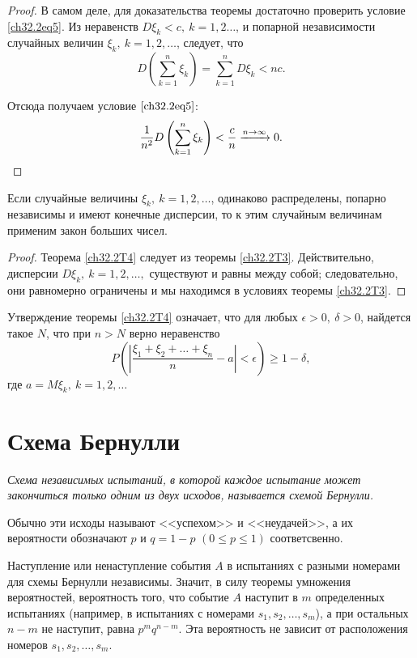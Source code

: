 \begin{proof}
В самом деле, для доказательства теоремы достаточно проверить условие \eqref{ch32.2eq5}. Из неравенств $D  \xi_k < c, \: k = 1, 2\ldots$, и попарной независимости случайных величин $\xi_k, \: k = 1,2,\ldots$, следует, что
$$
D  \left( \sum_{k  = 1}^{n} \xi_k\right) = \sum_{k  = 1}^{n} D  \xi_k  < nc.
$$

Отсюда получаем условие $\eqref{ch32.2eq5}$:
$$
\frac{1}{n^2} D  \left( \sum_{k  = 1}^{n} \xi_k\right) < \frac{c}{n} \xrightarrow{n \to \infty} 0. \qedhere
$$
\end{proof}

\begin{thm} \label{ch32.2T4}
Если случайные величины $\xi_k, \: k = 1,2,\ldots$, одинаково распределены, попарно независимы и имеют конечные дисперсии, то к этим случайным величинам применим закон больших чисел.
\end{thm}
\begin{proof}
Теорема \ref{ch32.2T4} следует из теоремы \ref{ch32.2T3}. Действительно, дисперсии $D\xi_k, \: k = 1,2, \ldots,$ существуют и равны между собой; следовательно, они равномерно ограничены и мы находимся в условиях теоремы \ref{ch32.2T3}.
\end{proof}
Утверждение теоремы \ref{ch32.2T4} означает, что для любых $\epsilon > 0, \: \delta > 0$, найдется такое $N$, что при $n > N$ верно неравенство
\begin{equation} \label{ch32.2eq6}
P \left( \left| \frac{\xi_1 + \xi_2 + \ldots + \xi_n}{n} - a \right| < \epsilon \right) \ge 1 - \delta,
\end{equation}
где $a = M  \xi_k, \: k = 1, 2, \ldots$

\section{Схема Бернулли}

\textit{Схема независимых испытаний, в которой каждое испытание может закончиться только одним из двух исходов, называется схемой Бернулли.}

Обычно эти исходы называют <<успехом>> и <<неудачей>>, а их вероятности обозначают $p$ и $q = 1 - p$ $(0 \le p \le 1)$ соответсвенно.

Наступление или ненаступление события $A$ в испытаниях с разными номерами для схемы Бернулли независимы. Значит, в силу теоремы умножения вероятностей, вероятность того, что событие $A$ наступит в $m$ определенных испытаниях (например, в испытаниях с номерами $s_1, s_2, \ldots, s_m$), а при остальных $n - m$ не наступит, равна $p^mq^{n - m}$. Эта вероятность не зависит от  расположения номеров $s_1, s_2, \ldots, s_m$.

